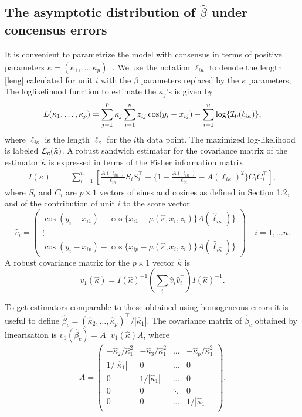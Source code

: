 \subsection{The asymptotic distribution of $\hat \beta$ under concensus errors}

It is convenient to parametrize the model with consensus in terms of positive parameters $\kappa=(\kappa_1,  \ldots, \kappa_p)^\top$. We use the notation $\ell_{i\kappa}$ to denote the length \eqref{leng} calculated for unit $i$ with the $\beta$ parameters replaced by the $\kappa$ parameters,
The loglikelihood function to estimate the $\kappa_j$'s is given by
$$
L(\kappa_1, \ldots, \kappa_p)= \sum_{j=1}^p \kappa_j  \sum_{i=1}^n z_{ij}\cos(y_i-x_{ij})- \sum_{i=1}^n \log\{{\cal I}_0(\ell_{i\kappa})\},
$$
where $\ell_{i\kappa}$ is the length $\ell_\kappa$ for the $i$th data point.  The maximized log-likelihood is labeled ${\cal L}_c( \hat \kappa)$.   A robust sandwich estimator for the covariance matrix of the estimator $\hat \kappa$  is expressed in terms of the Fisher information matrix
\begin{eqnarray*}
I(\kappa)   &=& \sum_{i=1}^n \left[\frac{A(\ell_{i\kappa})}{\ell_{i\kappa}}S_iS_i^\top +
   \{1- \frac{ A(\ell_{i\kappa})}{\ell_{i\kappa}}-A(\ell_{i\kappa})^2\} C_iC_i^\top\right],
\end{eqnarray*}
where  $S_i$ and $C_i$ are $p\times 1$ vectors of sines and cosines as defined in Section 1.2, and of the contribution of unit $i$ to the score vector
$$
\hat v_i=\begin{pmatrix}  \cos(y_i-x_{i1})-  \cos\{x_{i1}-\mu(\hat \kappa,x_i,z_i)\}  A(\hat \ell_{i\hat\kappa})\} \\ \vdots \\  \cos(y_i-x_{ip})-  \cos\{x_{ip}-\mu(\hat \kappa,x_i,z_i)\}  A(\hat \ell_{i\hat \kappa})\}
\end{pmatrix} \quad i=1,\ldots n.
$$
 A robust covariance matrix for the $p \times 1$ vector $\hat \kappa$ is
$$
v_1(\hat \kappa) = I(\hat \kappa)^{-1} \left( \sum_i \hat v_i \hat v_i^\top \right) I(\hat \kappa)^{-1}.
$$

To get estimators comparable to those obtained using homogeneous errors it is useful to define $\hat \beta_c= (\hat \kappa_2,\ldots, \hat \kappa_p)^\top/|\hat \kappa_1|$. The covariance matrix of $\hat \beta_c$ obtained by linearisation is
$v_1(\hat \beta_c)=A^\top v_1(\hat \kappa) A$, where
$$
A=\begin{pmatrix} -\hat \kappa_2/\hat \kappa_1^2 & -\hat \kappa_3/\hat \kappa_1^2 & \ldots &-\hat \kappa_p/\hat \kappa_1^2 \\
                    1/|\hat \kappa_1| & 0 &  \ldots & 0 \\
                    0 & 1/|\hat \kappa_1| &   \ldots & 0 \\
                    0 & 0 & \ddots    & 0  \\
                    0 & 0    & \ldots & 1/|\hat \kappa_1| \\
\end{pmatrix}.
$$


